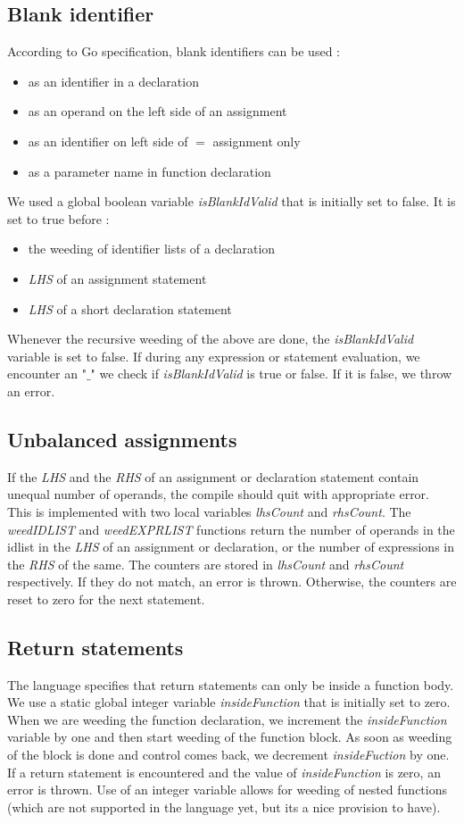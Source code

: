 \documentclass[preprint,12pt]{elsarticle}
\begin{document}
\subsection{Blank identifier}
According to Go specification, blank identifiers can be used :
\begin{itemize}
\item as an identifier in a declaration
\item as an operand on the left side of an assignment
\item as an identifier on left side of $=$ assignment only
\item as a parameter name in function declaration
\end{itemize}
We used a global boolean variable \textit{isBlankIdValid} that is initially set to false. It is set to true before :
\begin{itemize}
\item the weeding of identifier lists of a declaration
\item \textit{LHS} of an assignment statement
\item \textit{LHS} of a short declaration statement
\end{itemize} 
Whenever the recursive weeding of the above are done, the \textit{isBlankIdValid } variable is set to false. If during any expression or statement evaluation, we encounter an "$\_$" we check if \textit{isBlankIdValid} is true or false. If it is false, we throw an error.

\subsection{Unbalanced assignments}
If the \textit{LHS} and the \textit{RHS} of an assignment or declaration statement contain unequal number of operands, the compile should quit with appropriate error. This is implemented with two local variables \textit{lhsCount} and \textit{rhsCount}. The \textit{weedIDLIST} and \textit{weedEXPRLIST} functions return the number of operands in the idlist in the \textit{LHS} of an assignment or declaration, or the number of expressions in the \textit{RHS} of the same. The counters are stored in \textit{lhsCount} and \textit{rhsCount} respectively. If they do not match, an error is thrown. Otherwise, the counters are reset to zero for the next statement.

\subsection{Return statements}
The language specifies that return statements can only be inside a function body. We use a static global integer variable \textit{insideFunction} that is initially set to zero. When we are weeding the function declaration, we increment the \textit{insideFunction} variable by one and then start weeding of the function block. As soon as weeding of the block is done and control comes back, we decrement \textit{insideFuction} by one. If a return statement is encountered and the value of \textit{insideFunction} is zero, an error is thrown. Use of an integer variable allows for weeding of nested functions (which are not supported in the language yet, but its a nice provision to have).
\end{document}
